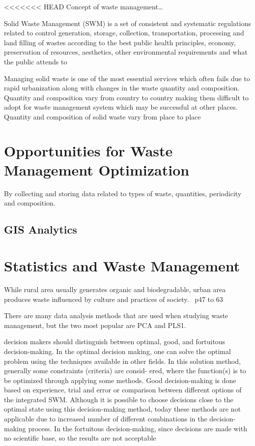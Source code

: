 \documentclass[sigconf]{acmart}
\begin{document}
<<<<<<< HEAD
Concept of waste management…

Solid Waste Management (SWM) is a set of consistent and systematic regulations related to control generation, storage, collection, transportation, processing and land filling of wastes according to the best public health principles, economy, preservation of resources, aesthetics, other environmental requirements and what the public attends to ~\cite{akbarpour2016}

Managing solid waste is one of the most essential services which often fails due to
rapid urbanization along with changes in the waste quantity and composition.
Quantity and composition vary from country to country making them difficult to
adopt for waste management system which may be successful at other places.
Quantity and composition of solid waste vary from place to place ~\cite{chandrappa2012} 




\section{Opportunities for Waste Management Optimization}

By collecting and storing data related to types of waste, quantities, periodicity and  composition.

\subsection{GIS Analytics}


\section{Statistics and Waste Management}




While rural area usually generates organic and biodegradable, urban area produces waste influenced by culture and practices of society.~\cite{chandrappa2012} p47 to 63



There are many data analysis methods that are used when studying waste management, but the two most popular are PCA and PLS1. 
~\cite{bohm2013}



decision makers should distinguish between optimal, good, and fortuitous decision-making. In the optimal decision making, one can solve the optimal problem using the techniques available in other fields. In this solution method, generally some constraints (criteria) are consid-
ered, where the function(s) is to be optimized through applying some methods. Good decision-making is done based on experience, trial and error or comparison between different options of the integrated SWM.
Although it is possible to choose decisions close to the optimal state using this decision-making method, today these methods are not applicable due to increased number of different combinations in the decision-making process. In the fortuitous decision-making, since decisions are made with no scientific base, so the results are not acceptable ~\cite{akbarpour2016}
\end{document}
